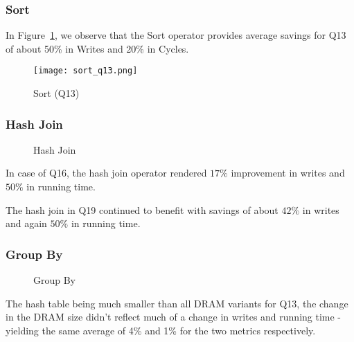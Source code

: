 \subsubsection{Sort}
In Figure~\ref{fig:sort}, we observe that the Sort operator provides average savings
for Q13 of about 50\% in Writes and 20\% in Cycles.

\begin{figure}[h]
	\centering
	\texttt{[image: sort\_q13.png]}
    \caption{Sort (Q13)}
	\label{fig:sort}
\end{figure}







\begin{comment}
We omit sorting results for Q16. This is because our algorithm, being
oblivious to the change in the underlying DRAM size, chose to use the
native version of sort for all DRAM sizes since the data size was lesser
than the original DRAM size of 4MB.
\end{comment}

\subsubsection{Hash Join}
\begin{figure}[h]
	\centering
	\hspace{0mm}
	\caption{Hash Join}
	\label{fig:join}
\end{figure}
In case of Q16, the hash join operator rendered $17\%$ improvement in
writes and $50\%$ in running time.

The hash join in Q19 continued to benefit with savings of about $42\%$ in writes and again $50\%$
in running time.

\begin{comment}
Not clear as to why the change in DRAM Size did not have any impact.
\end{comment}

\subsubsection{Group By} 
\begin{figure}[htbp]
\centering
{}
\hspace{0mm}

\caption{Group By}
\label{fig:gby}
\end{figure}
The hash table being much smaller than all DRAM variants for Q13, the
change in the DRAM size didn't reflect much of a change in writes and
running time - yielding the same average of 4\% and 1\% for the two
metrics respectively.

